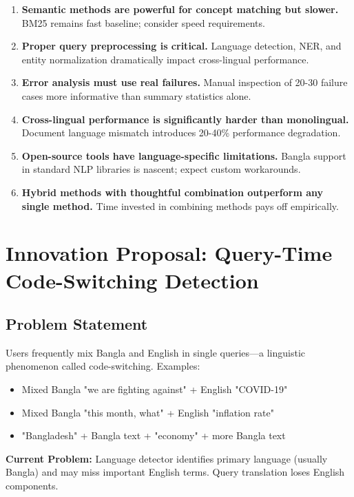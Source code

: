\documentclass[12pt,a4paper]{report}
\begin{document}
\begin{enumerate}
    \item \textbf{Semantic methods are powerful for concept matching but slower.} BM25 remains fast baseline; consider speed requirements.
    \item \textbf{Proper query preprocessing is critical.} Language detection, NER, and entity normalization dramatically impact cross-lingual performance.
    \item \textbf{Error analysis must use real failures.} Manual inspection of 20-30 failure cases more informative than summary statistics alone.
    \item \textbf{Cross-lingual performance is significantly harder than monolingual.} Document language mismatch introduces 20-40\% performance degradation.
    \item \textbf{Open-source tools have language-specific limitations.} Bangla support in standard NLP libraries is nascent; expect custom workarounds.
    \item \textbf{Hybrid methods with thoughtful combination outperform any single method.} Time invested in combining methods pays off empirically.
\end{enumerate}

\newpage

\chapter{Innovation Proposal: Query-Time Code-Switching Detection}

\section{Problem Statement}

Users frequently mix Bangla and English in single queries---a linguistic phenomenon called code-switching. Examples:

\begin{itemize}
    \item Mixed Bangla "we are fighting against" + English "COVID-19"
    \item Mixed Bangla "this month, what" + English "inflation rate"
    \item "Bangladesh" + Bangla text + "economy" + more Bangla text
\end{itemize}

\textbf{Current Problem:} Language detector identifies primary language (usually Bangla) and may miss important English terms. Query translation loses English components.
\end{document}
